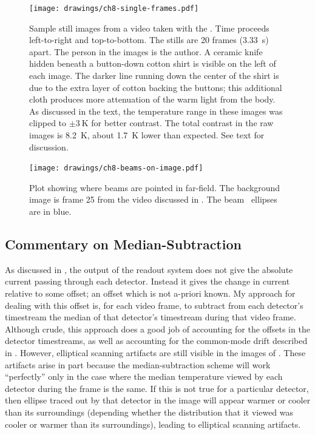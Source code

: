 \begin{figure}
\centering
\texttt{[image: drawings/ch8-single-frames.pdf]}
\caption[Sample still images from a video taken with the \Imager]{
Sample still images from a video taken with the \Imager.
Time proceeds left-to-right and top-to-bottom.
The stills are 20 frames (\SI{3.33}{\s}) apart.
The person in the images is the author.
A ceramic knife hidden beneath a button-down cotton shirt is visible on the left of each image.
The darker line running down the center of the shirt is due to the extra layer of cotton backing the buttons; this additional cloth produces more attenuation of the warm light from the body.
As discussed in the text, the temperature range in these images was clipped to $\pm \SI{3}{\K}$ for better contrast.
The total contrast in the raw images is \SI{8.2}{\K}, about \SI{1.7}{\K} lower than expected.
See text for discussion.
}
\label{fig:ch8-single-frames}
\end{figure}

\begin{figure}
\centering
\texttt{[image: drawings/ch8-beams-on-image.pdf]}
\caption[Plot showing where beams are pointed in far-field]{
  Plot showing where beams are pointed in far-field.
  The background image is frame 25 from the video discussed in .
  The beam \FWHM\ ellipses are in blue.
}
\label{fig:ch8-beams-on-image}
\end{figure}

\subsection{Commentary on Median-Subtraction}

As discussed in , the output of the readout system does not give the absolute current passing through each detector.
Instead it gives the change in current relative to some offset; an offset which is not a-priori known.
My approach for dealing with this offset is, for each video frame, to subtract from each detector's timestream the median of that detector's timestream during that video frame.
Although crude, this approach does a good job of accounting for the offsets in the detector timestreams, as well as accounting for the common-mode drift described in .
However, elliptical scanning artifacts are still visible in the images of .
These artifacts arise in part because the median-subtraction scheme will work ``perfectly'' only in the case where the median temperature viewed by each detector during the frame is the same.
If this is not true for a particular detector, then ellipse traced out by that detector in the image will appear warmer or cooler than its surroundings (depending whether the distribution that it viewed was cooler or warmer than its surroundings), leading to elliptical scanning artifacts.


